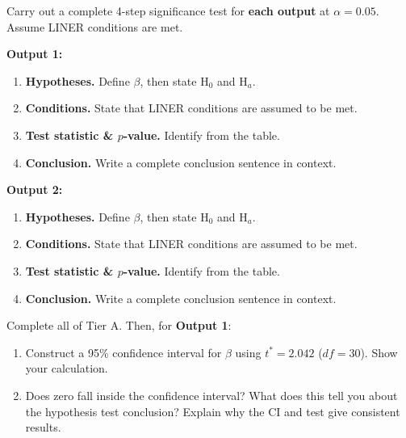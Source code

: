 \documentclass[10pt]{article}
\begin{document}
\begin{tcolorbox}[colback=white, colframe=black!40,
    title=\textbf{Tier A --- Approaching Proficiency},
    fonttitle=\bfseries, arc=2mm, left=3mm, right=3mm, top=2mm, bottom=2mm]

Carry out a complete 4-step significance test for \textbf{each output} at $\alpha = 0.05$.
Assume LINER conditions are met.

\textbf{Output 1:}
\begin{enumerate}[label=\alph*.]
  \item \textbf{Hypotheses.} Define $\beta$, then state H$_0$ and H$_a$. 
  \item \textbf{Conditions.} State that LINER conditions are assumed to be met. \writeline
  \item \textbf{Test statistic \& $p$-value.} Identify from the table. \writeline
  \item \textbf{Conclusion.} Write a complete conclusion sentence in context. 
\end{enumerate}

\textbf{Output 2:}
\begin{enumerate}[label=\alph*.]
  \item \textbf{Hypotheses.} Define $\beta$, then state H$_0$ and H$_a$. 
  \item \textbf{Conditions.} State that LINER conditions are assumed to be met. \writeline
  \item \textbf{Test statistic \& $p$-value.} Identify from the table. \writeline
  \item \textbf{Conclusion.} Write a complete conclusion sentence in context. 
\end{enumerate}

\end{tcolorbox}

\begin{tcolorbox}[colback=white, colframe=black!40,
    title=\textbf{Tier E --- Extension},
    fonttitle=\bfseries, arc=2mm, left=3mm, right=3mm, top=2mm, bottom=2mm]

Complete all of Tier A. Then, for \textbf{Output 1}:

\begin{enumerate}[label=\alph*.]
  \item Construct a 95\% confidence interval for $\beta$ using $t^* = 2.042$ ($df = 30$).
        Show your calculation.

  \item Does zero fall inside the confidence interval? What does this tell you about
        the hypothesis test conclusion? Explain why the CI and test give consistent results.
\end{enumerate}

\end{tcolorbox}
\end{document}
